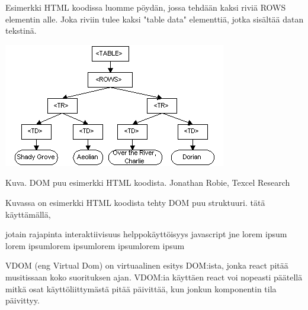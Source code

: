 Esimerkki HTML koodissa luomme pöydän, jossa tehdään kaksi riviä ROWS elementin alle. 
Joka riviin tulee kaksi "table data"{} elementtiä, jotka sisältää datan tekstinä.
\bigskip



\includegraphics{./src/public/oppar/dom.png}

Kuva\getImgCount .{} DOM puu esimerkki HTML koodista. Jonathan Robie, Texcel Research 
\medskip

Kuvassa on esimerkki HTML koodista tehty DOM puu struktuuri.
tätä käyttämällä, 

jotain rajapinta interaktiivisuus helppokäyttöisyys javascript jne lorem ipsum lorem ipsumlorem ipsumlorem ipsumlorem ipsum

\bigskip




VDOM (eng Virtual Dom) on virtuaalinen esitys DOM:ista, jonka react pitää musitissaan koko suorituksen ajan.
VDOM:ia käyttäen react voi nopeasti päätellä mitkä osat käyttöliittymästä pitää päivittää, kun jonkun komponentin tila päivittyy. 
\medskip



